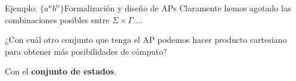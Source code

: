 \documentclass[spanish]{beamer}
\begin{document}
\begin{frame}{Ejemplo: $\{a^n b^n\}$}{Formalización y diseño de APs}
    Claramente hemos agotado las combinaciones posibles entre $\Sigma \times \Gamma$ ... \pause

    \bigskip

    ¿Con cuál otro conjunto que tenga el AP podemos hacer producto cartesiano para obtener más posibilidades de cómputo? \pause

    \bigskip

    Con el \textbf{conjunto de estados}.

    \begin{center}
    \end{center}
    
\end{frame}



% 
% 
\end{document}
